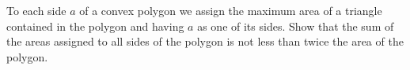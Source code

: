 To each side $a$ of a convex polygon we assign the maximum area of a triangle contained in the polygon and having $a$ as one of its sides. Show that the sum of the areas assigned to all sides of the polygon is not less than twice the area of the polygon.
